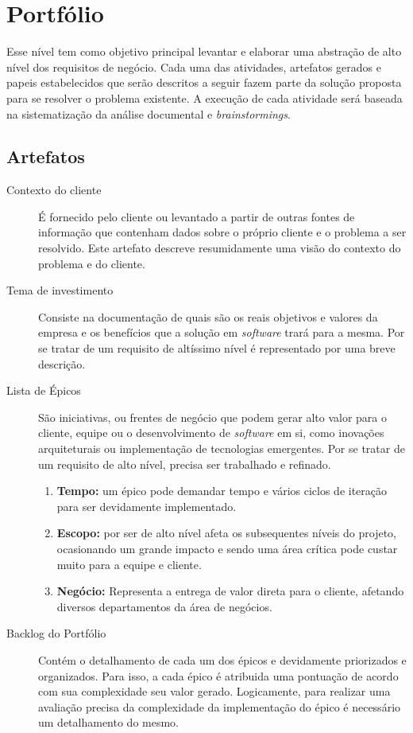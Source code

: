 \section{Portfólio}
Esse nível tem como objetivo principal levantar e elaborar uma abstração de alto nível dos requisitos de negócio. Cada uma das atividades, artefatos gerados e papeis estabelecidos que serão descritos a seguir fazem parte da solução proposta para se resolver o problema existente. A execução de cada atividade será baseada na sistematização da análise documental e \textit{brainstormings}.

\subsection{Artefatos}
\begin{description}
\item[Contexto do cliente] É fornecido pelo cliente ou levantado a partir de outras fontes de informação que contenham dados sobre o próprio cliente e o problema a ser resolvido. Este artefato descreve resumidamente uma visão do contexto do problema e do cliente.
\item[Tema de investimento] Consiste na documentação de quais são os reais objetivos e valores da empresa e os benefícios que a solução em \textit{software} trará para a mesma. Por se tratar de um requisito de altíssimo nível é representado por uma breve descrição.
\item[Lista de Épicos] São iniciativas, ou frentes de negócio que podem gerar alto valor para o cliente, equipe ou o desenvolvimento de \textit{software} em si, como inovações arquiteturais ou implementação de tecnologias emergentes. Por se tratar de um requisito de alto nível, precisa ser trabalhado e refinado.
  \begin{enumerate}
    \item \textbf{Tempo:} um épico pode demandar tempo e vários ciclos de iteração para ser devidamente implementado.
    \item \textbf{Escopo:} por ser de alto nível afeta os subsequentes níveis do projeto, ocasionando um grande impacto e sendo uma área crítica pode custar muito para a equipe e cliente.
    \item \textbf{Negócio:} Representa a entrega de valor direta para o cliente, afetando diversos departamentos da área de negócios.
  \end{enumerate} 
\item[Backlog do Portfólio] Contém o detalhamento de cada um dos épicos e devidamente priorizados e organizados. Para isso, a cada épico é atribuida uma pontuação de acordo com sua complexidade seu valor gerado. Logicamente, para realizar uma avaliação precisa da complexidade da implementação do épico é necessário um detalhamento do mesmo.
\end{description}

